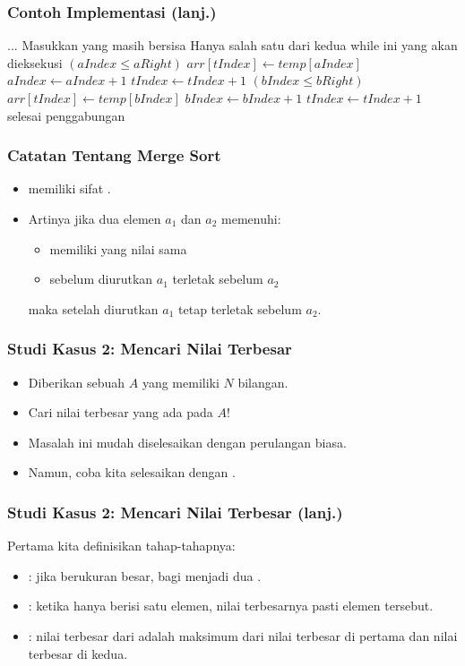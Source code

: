 \begin{frame}
\frametitle{Contoh Implementasi (lanj.)}
\begin{codebox}
\setcounter{codelinenumber}{13}
\li $...$
\li \Comment Masukkan \fsubarray yang masih bersisa
\li \Comment Hanya salah satu dari kedua while ini yang akan dieksekusi
\li \While $(aIndex \leq aRight)$ \Do
\li   $arr[tIndex] \gets temp[aIndex]$
\li   $aIndex \gets aIndex + 1$
\li   $tIndex \gets tIndex + 1$
    \End
\li \While $(bIndex \leq bRight)$ \Do
\li   $arr[tIndex] \gets temp[bIndex]$
\li   $bIndex \gets bIndex + 1$
\li   $tIndex \gets tIndex + 1$
    \End
\li \Comment selesai penggabungan
\end{codebox}
\end{frame}

\begin{frame}
\frametitle{Catatan Tentang Merge Sort}
\begin{itemize}
  \item \fMergeSort memiliki sifat .
  \item Artinya jika dua elemen $a_1$ dan $a_2$ memenuhi:
  \begin{itemize}
    \item memiliki yang nilai sama
    \item sebelum diurutkan $a_1$ terletak sebelum $a_2$
  \end{itemize}
  maka setelah diurutkan $a_1$ tetap terletak sebelum $a_2$.
\end{itemize}
\end{frame}

\begin{frame}
\frametitle{Studi Kasus 2: Mencari Nilai Terbesar}
\begin{itemize}
  \item Diberikan sebuah \farray $A$ yang memiliki $N$ bilangan.
  \item Cari nilai terbesar yang ada pada $A$!\newline
  \item Masalah ini mudah diselesaikan dengan perulangan biasa.
  \item Namun, coba kita selesaikan dengan \fdivideAndConquer.\end{itemize}
\end{frame}

\begin{frame}
\frametitle{Studi Kasus 2: Mencari Nilai Terbesar (lanj.)}
Pertama kita definisikan tahap-tahapnya:
\begin{itemize}
  \item {}: jika \farray berukuran besar, bagi menjadi dua \fsubarray.
  \item {}: ketika \farray hanya berisi satu elemen, nilai terbesarnya pasti elemen tersebut.
  \item {}: nilai terbesar dari \farray adalah maksimum dari nilai terbesar di \fsubarray pertama dan nilai terbesar di \fsubarray kedua.
\end{itemize}
\end{frame}

